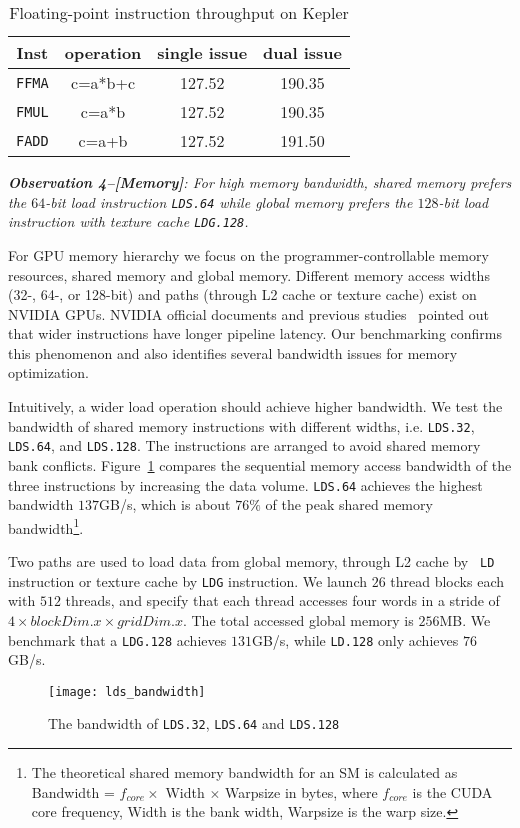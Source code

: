 \begin{table}[htbp]
\caption{Floating-point instruction throughput on Kepler}
\centering
\scalebox{0.9} {
\begin{tabular}{|c|c|c|c|}
\hline
Inst &operation&single issue&dual issue\\
\hline
{\tt FFMA} &c=a*b+c&127.52&190.35 \\
\hline
{\tt FMUL} &c=a*b&127.52&190.35 \\
\hline
{\tt FADD} &c=a+b&127.52&191.50\\
\hline
\end{tabular}
}
\label{tab:ffma}
\end{table}

{\em {\bf Observation 4--[Memory]}: For high memory bandwidth, shared memory prefers the $64$-bit load
instruction {\tt LDS.64} while global memory prefers the $128$-bit load instruction with texture cache {\tt LDG.128}.}

For GPU memory hierarchy we focus on the programmer-controllable memory resources, shared memory and global memory.
Different memory access widths (32-, 64-, or 128-bit) and paths (through L2 cache or texture cache) exist on NVIDIA GPUs.
NVIDIA official documents and previous studies~\cite{tan} pointed out that wider
instructions have longer pipeline latency.
Our benchmarking confirms this phenomenon and also identifies several bandwidth issues for memory optimization.

Intuitively, a wider load operation should achieve higher bandwidth.
We test the bandwidth of shared memory instructions with different widths, i.e. {\tt LDS.32}, {\tt LDS.64}, and {\tt LDS.128}.
The instructions are arranged to avoid shared memory bank conflicts.
Figure~\ref{fig:lds_bw} compares the sequential memory access bandwidth of the three instructions by increasing the data volume.
{\tt LDS.64} achieves the highest bandwidth $137$GB/s, which is about $76\%$ of the peak shared memory bandwidth\footnote{The
theoretical shared memory bandwidth for an SM is calculated as Bandwidth = $f_{core} \times$ Width $\times$ Warpsize in bytes, where $f_{core}$ is the CUDA core frequency, Width is the bank width, Warpsize is the warp size.}.

Two paths are used to load data from global memory, through L2 cache by {\tt
LD} instruction or texture cache by {\tt LDG} instruction.
We launch $26$ thread blocks each with $512$ threads, and specify that each thread accesses four words in a stride of $4 \times blockDim.x \times gridDim.x$.
The total accessed global memory is $256$MB.
We benchmark that a {\tt LDG.128} achieves $131$GB/s, while {\tt LD.128} only achieves $76$GB/s.

\begin{figure}[htbp]
\begin{center}
\texttt{[image: lds\_bandwidth]}
    \caption{ The bandwidth of {\tt LDS.32}, {\tt LDS.64} and {\tt LDS.128}}
\label{fig:lds_bw}
\end{center}
\end{figure}
